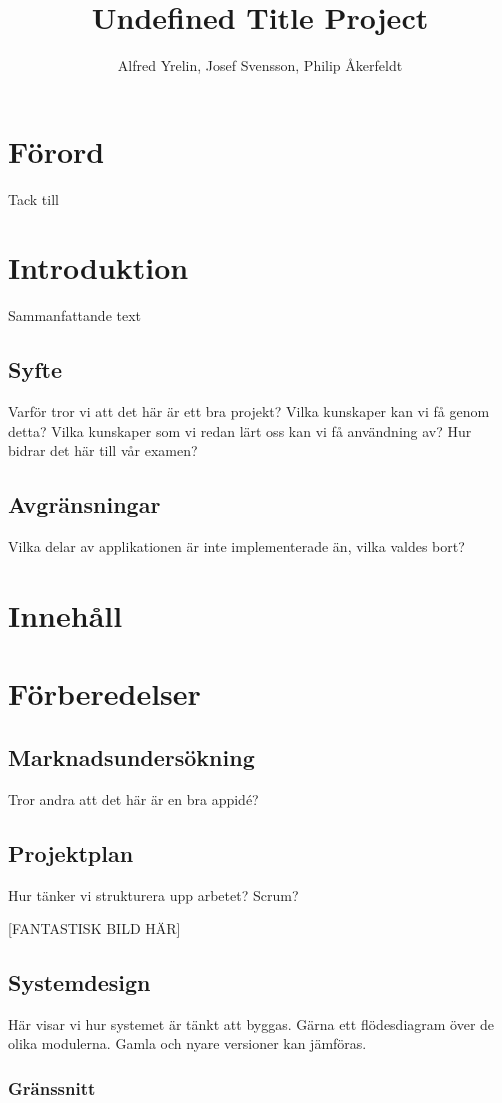 \documentclass[12pt,a4paper]{article}
\author{Alfred Yrelin, Josef Svensson, Philip Åkerfeldt}
\title{Undefined Title Project}
\begin{document}
\maketitle

\section{Förord}
Tack till 
\section{Introduktion}
Sammanfattande text
\subsection{Syfte}
Varför tror vi att det här är ett bra projekt?
Vilka kunskaper kan vi få genom detta?
Vilka kunskaper som vi redan lärt oss kan vi få användning av?
Hur bidrar det här till vår examen?
\subsection{Avgränsningar}
Vilka delar av applikationen är inte implementerade än, vilka valdes bort?
\section{Innehåll}
\tableofcontents
\section{Förberedelser}
\subsection{Marknadsundersökning}
Tror andra att det här är en bra appidé?
\subsection{Projektplan}
Hur tänker vi strukturera upp arbetet? Scrum?

[FANTASTISK BILD HÄR]
\subsection{Systemdesign}
Här visar vi hur systemet är tänkt att byggas. Gärna ett flödesdiagram över de olika modulerna. Gamla och nyare versioner kan jämföras.
\subsubsection{Gränssnitt}
\end{document}
